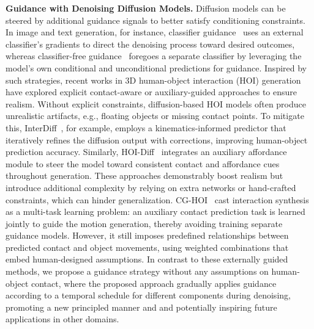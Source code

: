 \noindent \textbf{Guidance with Denoising Diffusion Models.}
Diffusion models can be steered by additional guidance signals to better satisfy conditioning constraints. In image and text generation, for instance, classifier guidance~\citep{dhariwal2021diffusion} uses an external classifier’s gradients to direct the denoising process toward desired outcomes, whereas classifier-free guidance~\citep{ho2022classifier} foregoes a separate classifier by leveraging the model’s own conditional and unconditional predictions for guidance. Inspired by such strategies, recent works in 3D human-object interaction (HOI) generation have explored explicit contact-aware or auxiliary-guided approaches to ensure realism. Without explicit constraints, diffusion-based HOI models often produce unrealistic artifacts, e.g., floating objects or missing contact points. To mitigate this, InterDiff~\citep{xu2023interdiff}, for example, employs a kinematics-informed predictor that iteratively refines the diffusion output with corrections, improving human-object prediction accuracy. Similarly, HOI-Diff~\citep{peng2023hoi} integrates an auxiliary affordance module to steer the model toward consistent contact and affordance cues throughout generation. These approaches demonstrably boost realism but introduce additional complexity by relying on extra networks or hand-crafted constraints, which can hinder generalization. CG-HOI~\citep{diller2023cg} cast interaction synthesis as a multi-task learning problem: an auxiliary contact prediction task is learned jointly to guide the motion generation, thereby avoiding training separate guidance models. However, it still imposes predefined relationships between predicted contact and object movements, using weighted combinations that embed human-designed assumptions. In contrast to these externally guided methods, we propose a guidance strategy without any assumptions on human-object contact, where the proposed approach gradually applies guidance according to a temporal schedule for different components during denoising, promoting a new principled manner and and potentially inspiring future applications in other domains.
